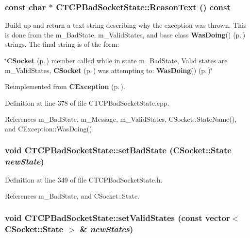 \subsubsection{\setlength{\rightskip}{0pt plus 5cm}const char $\ast$ CTCPBad\-Socket\-State::Reason\-Text () const\hspace{0.3cm}{\tt  [virtual]}}\label{classCTCPBadSocketState_a7}


Build up and return a text string describing why the  exception was thrown. This is done from the m\_\-Bad\-State, m\_\-Valid\-States, and base class {\bf Was\-Doing}() {\rm (p.\,\pageref{classCException_a10})} strings. The final string is of the form:

\char`\"{}{\bf CSocket} {\rm (p.\,\pageref{classCSocket})} member called while in state m\_\-Bad\-State, Valid states are m\_\-Valid\-States, {\bf CSocket} {\rm (p.\,\pageref{classCSocket})} was attempting to: {\bf Was\-Doing}() {\rm (p.\,\pageref{classCException_a10})}\char`\"{} 

Reimplemented from {\bf CException} {\rm (p.\,\pageref{classCException_a8})}.

Definition at line 378 of file CTCPBad\-Socket\-State.cpp.

References m\_\-Bad\-State, m\_\-Message, m\_\-Valid\-States, CSocket::State\-Name(), and CException::Was\-Doing().
\subsubsection{\setlength{\rightskip}{0pt plus 5cm}void CTCPBad\-Socket\-State::set\-Bad\-State ({\bf CSocket::State} {\em new\-State})\hspace{0.3cm}{\tt  [inline, protected]}}\label{classCTCPBadSocketState_b0}




Definition at line 349 of file CTCPBad\-Socket\-State.h.

References m\_\-Bad\-State, and CSocket::State.
\subsubsection{\setlength{\rightskip}{0pt plus 5cm}void CTCPBad\-Socket\-State::set\-Valid\-States (const vector$<$ {\bf CSocket::State} $>$ \& {\em new\-States})\hspace{0.3cm}{\tt  [inline, protected]}}\label{classCTCPBadSocketState_b1}




